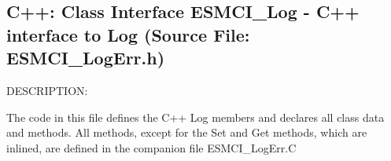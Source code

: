  
\setlength{\oldparskip}{\parskip}
\setlength{\parskip}{1.5ex}
\setlength{\oldparindent}{\parindent}
\setlength{\parindent}{0pt}
\setlength{\oldbaselineskip}{\baselineskip}
\setlength{\baselineskip}{11pt}
 
\def\bv{\begin{verbatim}}
\def\ev{\end{verbatim}}
\def\be{\begin{equation}}
\def\ee{\end{equation}}
\def\bea{\begin{eqnarray}}
\def\eea{\end{eqnarray}}
\def\bi{\begin{itemize}}
\def\ei{\end{itemize}}
\def\bn{\begin{enumerate}}
\def\en{\end{enumerate}}
\def\bd{\begin{description}}
\def\ed{\end{description}}
\def\({\left (}
\def\){\right )}
\def\[{\left [}
\def\]{\right ]}
\def\<{\left  \langle}
\def\>{\right \rangle}
\def\cI{{\cal I}}
\def\diag{\mathop{\rm diag}}
\def\tr{\mathop{\rm tr}}


 
\subsection{C++:  Class Interface ESMCI\_Log - C++ interface to Log (Source File: ESMCI\_LogErr.h)}


  
{\sf DESCRIPTION:\\ }


  
   The code in this file defines the C++ Log members and declares all class
   data and methods.  All methods, except for the Set and Get methods, which
   are inlined, are defined in the companion file ESMCI\_LogErr.C
  
